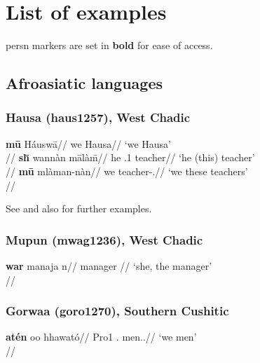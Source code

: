 \documentclass[A4paper]{article}
\begin{document}

\section{List of examples}

\gls{persn} markers are set in \textbf{bold} for ease of access.


\subsection{Afroasiatic languages}


\subsubsection{Hausa (haus1257), West Chadic}

\pex
\a \begingl
\gla \textbf{m\={u}} Háusw\={a}//
\glb we Hausa//
\glft `we Hausa'\\\citep[371]{newman2000}//
\endgl
\a \begingl
\gla \textbf{sh\={\textsci}} wannàn m\={a}làm\={\textsci}//
\glb he \Dem{}.1 teacher//
\glft `he (this) teacher'\\{\citep[after][371]{newman2000}}//
\endgl
\a
\begingl
\gla \textbf{m\={u}} mlàman-nàn//
\glb we teacher-\Dem.\Prox{}//
\glft `we these teachers'\\\citep[155]{newman2000}//
\endgl
\xe

See \citet[63, 155, 370f.]{newman2000} and also \citet[330f.]{jaggar2001} for further examples.




\subsubsection{Mupun (mwag1236), West Chadic}
 
\ex
\begingl
\gla \textbf{war} manaja n\textschwa//
\F{} manager \Def{}//
\glft `she, the manager'\\\citep[after][172, (154)]{frajzyngier1993}//
\endgl
\xe
 
\subsubsection{Gorwaa (goro1270), Southern Cushitic}

\ex
\begingl
\gla \textbf{atén} oo hhawató//
\glb Pro1\Pl{} \Anaph.\M{} men.\Lnk.\M{}//
\glft `we men'\\\citep[after][163, (2.205)]{harvey2018}//
\endgl
\xe
\end{document}
